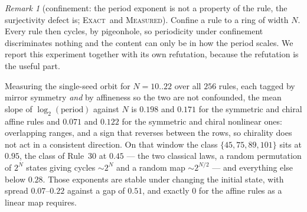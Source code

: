 \documentclass[11pt]{article}
\theoremstyle{definition}
\theoremstyle{remark}
\newtheorem{remark}[theorem]{Remark}
\newcommand{\EXACT}{\textsc{Exact}}
\newcommand{\MEASURED}{\textsc{Measured}}
\begin{document}
\begin{remark}[confinement: the period exponent is not a property of the rule, the surjectivity defect is; \EXACT\ and \MEASURED]\label{du:ring}
Confine a rule to a ring of width $N$. Every rule then cycles, by pigeonhole, so periodicity under
confinement discriminates nothing and the content can only be in how the period scales. We report this
experiment together with its own refutation, because the refutation is the useful part.

Measuring the single-seed orbit for $N=10..22$ over all $256$ rules, each tagged by mirror symmetry
\emph{and} by affineness so the two are not confounded, the mean slope of $\log_2(\text{period})$
against $N$ is $0.198$ and $0.171$ for the symmetric and chiral affine rules and $0.071$ and $0.122$ for
the symmetric and chiral nonlinear ones: overlapping ranges, and a sign that reverses between the rows,
so chirality does not act in a consistent direction. On that window the class $\{45,75,89,101\}$ sits at
$0.95$, the class of Rule~30 at $0.45$ --- the two classical laws, a random permutation of $2^N$ states
giving cycles $\sim2^N$ and a random map $\sim2^{N/2}$ --- and everything else below $0.28$. Those
exponents are stable under changing the initial state, with spread $0.07$--$0.22$ against a gap of
$0.51$, and exactly $0$ for the affine rules as a linear map requires.


\end{remark}
\end{document}
